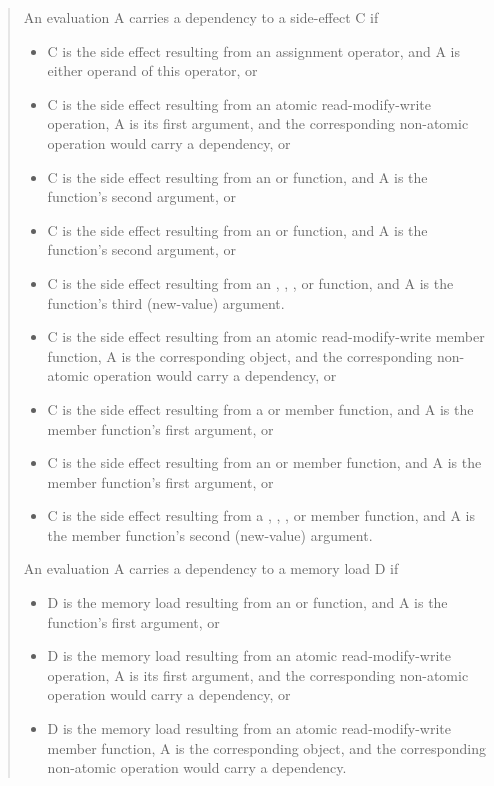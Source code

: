 \documentclass[letterpaper,twocolumn,10pt]{article}
\begin{document}
\begin{quote}
	An evaluation A carries a dependency to a side-effect C if
	\begin{itemize}
	\item	C is the side effect resulting from an assignment
		operator, and A is either operand of this operator, or
	\item	C is the side effect resulting from an atomic
		read-modify-write operation, A is its first argument,
		and the corresponding non-atomic operation would carry
		a dependency, or
	\item	C is the side effect resulting from an 
		or  function,
		and A is the function's second argument, or
	\item	C is the side effect resulting from an 
		or  function,
		and A is the function's second argument, or
	\item	C is the side effect resulting from an
		,
		,
		, or
		function, and A is the function's
		third (new-value) argument.
	\item	C is the side effect resulting from an atomic
		read-modify-write member function, A is the corresponding
		object, and the corresponding non-atomic operation would
		carry a dependency, or
	\item	C is the side effect resulting from a 
		or  member function,
		and A is the member function's first argument, or
	\item	C is the side effect resulting from an 
		or  member function,
		and A is the member function's first argument, or
	\item	C is the side effect resulting from a
		,
		,
		, or
		member function, and A is the member function's
		second (new-value) argument.
	\end{itemize}

	An evaluation A carries a dependency to a memory load D if
	\begin{itemize}
	\item	D is the memory load resulting from an 
		or  function,
		and A is the function's first argument, or
	\item	D is the memory load resulting from an atomic
		read-modify-write operation, A is its first argument,
		and the corresponding non-atomic operation would carry
		a dependency, or
	\item	D is the memory load resulting from an atomic
		read-modify-write member function, A is the corresponding
		object, and the corresponding non-atomic operation would
		carry a dependency.
	\end{itemize}


\end{quote}
\end{document}
